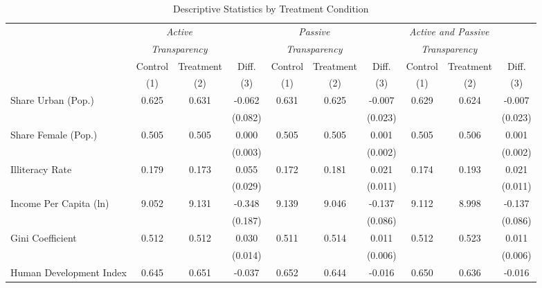 \begin{table}[!htbp]
\centering
\caption{Descriptive Statistics by Treatment Condition}
\label{tab:descriptivestats3}
\scriptsize
\begin{tabular}{@{\extracolsep{-4pt}}l@{\extracolsep{-3pt}}ccccccccc}
\hline
\hline
& \multicolumn{2}{c}{\emph{Active}} & & \multicolumn{2}{c}{\emph{Passive}} & & \multicolumn{2}{c}{\emph{Active and Passive}} \T \\
& \multicolumn{2}{c}{\emph{Transparency}} & & \multicolumn{2}{c}{\emph{Transparency}} & & \multicolumn{2}{c}{\emph{Transparency}} \B \\
\cline{2-3} \cline{5-6} \cline{8-9}
& Control & Treatment & Diff. & Control & Treatment & Diff. & Control & Treatment & Diff. \T \B \\
& (1) & (2) & (3) & (1) & (2) & (3) & (1) & (2) & (3) \B \\
\hline
Share Urban (Pop.)                   & 0.625 & 0.631 & -0.062 & 0.631 & 0.625 & -0.007 &  0.629 & 0.624 & -0.007 \T \\
                                     &       &       & (0.082)&       &       & (0.023)&        &       & (0.023)   \\
Share Female (Pop.)                  & 0.505 & 0.505 & 0.000  & 0.505 & 0.505 & 0.001  &  0.505 & 0.506 & 0.001     \\
                                     &       &       & (0.003)&       &       & (0.002)&        &       & (0.002)   \\
Illiteracy Rate                      & 0.179 & 0.173 & 0.055  & 0.172 & 0.181 & 0.021  &  0.174 & 0.193 & 0.021     \\
                                     &       &       & (0.029)&       &       & (0.011)&        &       & (0.011)   \\
Income Per Capita (ln)               & 9.052 & 9.131 & -0.348 & 9.139 & 9.046 & -0.137 &  9.112 & 8.998 & -0.137    \\
                                     &       &       & (0.187)&       &       & (0.086)&        &       & (0.086)   \\
Gini Coefficient                     & 0.512 & 0.512 & 0.030  & 0.511 & 0.514 & 0.011  &  0.512 & 0.523 & 0.011     \\
                                     &       &       & (0.014)&       &       & (0.006)&        &       & (0.006)   \\
Human Development Index \hspace{1pt} & 0.645 & 0.651 & -0.037 & 0.652 & 0.644 & -0.016 &  0.650 & 0.636 & -0.016    \\

\end{tabular}
\end{table}

